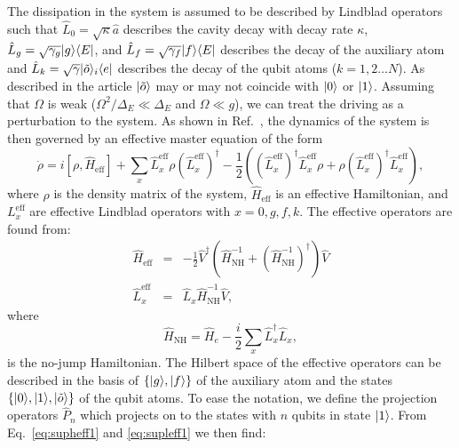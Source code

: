 The dissipation in the system is assumed to be described by Lindblad operators
such that $\hat{L}_{0}=\sqrt{\kappa}\hat{a}$ describes the cavity decay with
decay rate $\kappa$, $\hat{L}_{g}=\sqrt{\gamma_{g}}| g \rangle\langle E |$, and
$\hat{L}_{f}=\sqrt{\gamma_{f}}| f \rangle\langle E |$ describes the decay of the
auxiliary atom and $\hat{L}_{k}=\sqrt{\gamma}| \tilde{o} \rangle_{i}\langle e |$
describes the decay of the qubit atoms ($k=1,2\ldots N$). As described in the
article $| \tilde{o} \rangle$ may or may not coincide with $| 0 \rangle$ or $| 1 \rangle$.
Assuming that $\Omega$ is weak ($\Omega^{2}/\Delta_{E}\ll\Delta_{E}$ and
$\Omega\ll g$), we can treat the driving as a perturbation to the system. As
shown in Ref.~\cite{Florentin}, the dynamics of the system is then governed by
an effective master equation of the form
\begin{equation}
\dot{\rho}=i\left[\rho,\hat{H}_{\text{eff}}\right] +
\sum_{x}\hat{L}_{x}^{\text{eff}}\rho(\hat{L}_{x}^{\text{eff}})^{\dagger}-\frac{1}{2}\left((\hat{L}_{x}^{\text{eff}})^{\dagger}\hat{L}_{x}^{\text{eff}}\rho+\rho(\hat{L}_{x}^{\text{eff}})^{\dagger}\hat{L}_{x}^{\text{eff}}\right),
\end{equation}
where $\rho$ is the density matrix of the system, $\hat{H}_{\text{eff}}$ is an
effective Hamiltonian, and  $L_{x}^{\text{eff}}$ are effective Lindblad
operators with $x=0,g,f,k$.  The effective operators are found from:
\begin{eqnarray} \label{eq:supheff1}
\hat{H}_{\text{eff}}&=&-\frac{1}{2}\hat{V}^{\dagger}\left(\hat{H}_{\text{NH}}^{-1}+(\hat{H}_{\text{NH}}^{-1})^{\dagger}\right)\hat{V}
\\
\hat{L}_{x}^{\text{eff}}&=&\hat{L}_{x}\hat{H}_{\text{NH}}^{-1}\hat{V},  \label{eq:supleff1}
\end{eqnarray}
where 
\begin{equation}
\hat{H}_{\text{NH}}=\hat{H}_{e}-\frac{i}{2}\sum_{x}\hat{L}_{x}^{\dagger}\hat{L}_{x},
\end{equation}
is the no-jump Hamiltonian. The Hilbert space of the effective operators can be
described in the basis of $\left\{| g \rangle,| f \rangle\right\}$ of the auxiliary atom
and the states $\left\{| 0 \rangle,| 1 \rangle,| \tilde{o} \rangle\right\}$ of the qubit
atoms. To ease the notation, we define the projection operators $\hat{P}_{n}$
which projects on to the states with $n$ qubits in state $| 1 \rangle$. From
Eq.~\eqref{eq:supheff1} and \eqref{eq:supleff1} we then find:
